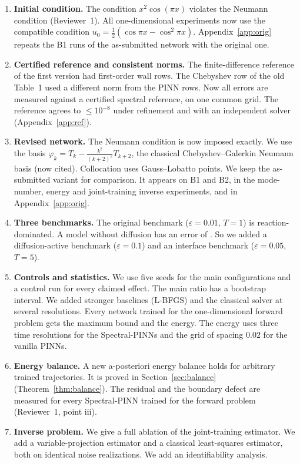 \documentclass[11pt]{article}
\begin{document}
\begin{enumerate}[leftmargin=*,itemsep=2pt]
\item \textbf{Initial condition.} The condition $x^2\cos(\pi x)$ violates the Neumann condition (Reviewer~1). All one-dimensional experiments now use the compatible condition $u_0=\frac12(\cos\pi x-\cos^2\pi x)$. Appendix~\ref{app:orig} repeats the B1 runs of the as-submitted network with the original one.
\item \textbf{Certified reference and consistent norms.} The finite-difference reference of the first version had first-order wall rows. The Chebyshev row of the old Table~1 used a different norm from the PINN rows. Now all errors are measured against a certified spectral reference, on one common grid. The reference agrees to $\le10^{-8}$ under refinement and with an independent solver (Appendix~\ref{app:ref}).
\item \textbf{Revised network.} The Neumann condition is now imposed exactly. We use the basis $\varphi_k=T_k-\frac{k^2}{(k+2)^2}T_{k+2}$, the classical Chebyshev--Galerkin Neumann basis (now cited). Collocation uses Gauss--Lobatto points. We keep the as-submitted variant for comparison. It appears on B1 and B2, in the mode-number, energy and joint-training inverse experiments, and in Appendix~\ref{app:orig}.
\item \textbf{Three benchmarks.} The original benchmark ($\varepsilon=0.01$, $T=1$) is reaction-dominated. A model without diffusion has an error of . So we added a diffusion-active benchmark ($\varepsilon=0.1$) and an interface benchmark ($\varepsilon=0.05$, $T=5$).
\item \textbf{Controls and statistics.} We use five seeds for the main configurations and a control run for every claimed effect. The main ratio has a bootstrap interval. We added stronger baselines (L-BFGS) and the classical solver at several resolutions. Every network trained for the one-dimensional forward problem gets the maximum bound and the energy. The energy uses three time resolutions for the Spectral-PINNs and the grid of spacing $0.02$ for the vanilla PINNs.
\item \textbf{Energy balance.} A new a-posteriori energy balance holds for arbitrary trained trajectories. It is proved in Section~\ref{sec:balance} (Theorem~\ref{thm:balance}). The residual and the boundary defect are measured for every Spectral-PINN trained for the forward problem (Reviewer~1, point iii).
\item \textbf{Inverse problem.} We give a full ablation of the joint-training estimator. We add a variable-projection estimator and a classical least-squares estimator, both on identical noise realizations. We add an identifiability analysis.

\end{enumerate}
\end{document}
